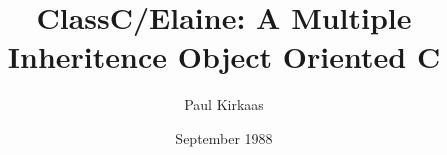 

\setlength{\textwidth}{6in}
\setlength{\textheight}{9.5in}
\setlength{\evensidemargin}{1in}
\setlength{\oddsidemargin}{1in}
\date{September 1988}

\title{ClassC/Elaine: A Multiple Inheritence Object Oriented C}
\author{Paul Kirkaas}    %

\tableofcontents
\maketitle



%
 

